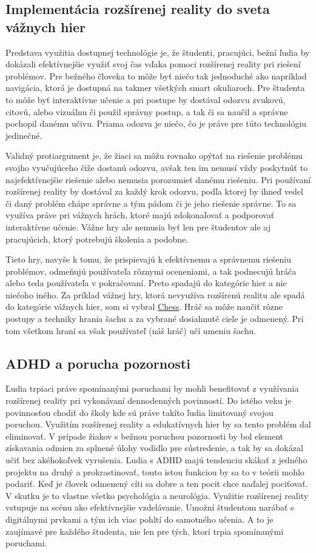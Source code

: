 \documentclass[10pt,twoside,a4paper]{article}
\begin{document}
\subsection{Implementácia rozšírenej reality do sveta vážnych hier}
\par Predstava využitia dostupnej technológie je, že študenti, pracujúci, bežní ľudia by dokázali efektívnejšie využiť svoj čas vďaka pomoci rozšírenej reality pri riešení problémov. Pre bežného človeka to môže byť niečo tak jednoduché ako napríklad navigácia, ktorá je dostupná na takmer všetkých smart okuliaroch. Pre študenta to môže byť interaktívne učenie a pri postupe by dostával odozvu zvukovú, citovú, alebo vizuálnu či použil správny postup, a tak či sa naučil a správne pochopil danému učivu. Priama odozva je niečo, čo je práve pre túto technológiu jedinečné. \par Validný protiargument je, že žiaci sa môžu rovnako opýtať na riešenie problému svojho vyučujúceho čiže dostanú odozvu, avšak ten im nemusí vždy poskytnúť to najefektívnejšie riešenie alebo nemusia porozumieť danému riešeniu. Pri používaní rozšírenej reality by dostával za každý krok odozvu, podľa ktorej by ihneď vedel či daný problém chápe správne a tým pádom či je jeho riešenie správne. To sa využíva práve pri vážnych hrách, ktoré majú zdokonaľovať a podporovať interaktívne učenie. Vážne hry ale nemusia byť len pre študentov ale aj pracujúcich, ktorý potrebujú školenia a podobne. \par Tieto hry, navyše k tomu, že prispievajú k efektívnemu a správnemu riešeniu problémov, odmeňujú používateľa rôznymi oceneniami, a tak podnecujú hráča alebo teda používateľa v pokračovaní. Preto spadajú do kategórie hier a nie niečoho iného. Za príklad vážnej hry, ktorá nevyužíva rozšírenú realitu ale spadá do kategórie vážnych hier, som si vybral \href{https://www.chess.com/}{Chess}. Hráč sa môže naučiť rôzne postupy a techniky hrania šachu a za vybrané dosiahnuté ciele je odmenený. Pri tom všetkom hraní sa však používateľ (náš hráč) učí umeniu šachu.


\subsection{ADHD a porucha pozornosti}
Ľudia trpiaci práve spomínanými poruchami by mohli benefitovať z využívania rozšírenej reality pri vykonávaní dennodenných povinností. Do istého veku je povinnosťou chodiť do školy kde sú práve takíto ľudia limitovaný svojou poruchou. Využitím rozšírenej reality a edukatívnych hier by sa tento problém dal eliminovať. V prípade žiakov s bežnou poruchou pozornosti by bol element získavania odmien za splnené úlohy vodidlo pre sústredenie, a tak by sa dokázal učiť bez akéhokoľvek vyrušenia. Ľudia s ADHD majú tendenciu skákať z jedného projektu na druhý a prokrastinovať, touto istou funkciou by sa to v teórii mohlo podariť. Keď je človek odmenený cíti sa dobre a ten pocit chce naďalej pociťovať. V skutku je to vlastne všetko psychológia a neurológia. Využitie rozšírenej reality vstupuje na scénu ako efektívnejšie vzdelávanie. Umožní študentom narábať s digitálnymi prvkami a tým ich viac pohltí do samotného učenia. A to je zaujímavé pre každého študenta, nie len pre tých, ktorí trpia spomínanými poruchami. 
\end{document}

